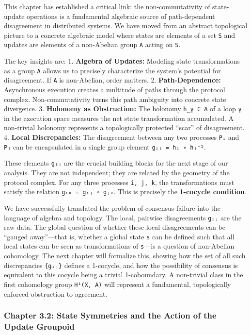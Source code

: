 \documentclass[
]{article}
\begin{document}
This chapter has established a critical link: the non-commutativity of
state-update operations is a fundamental algebraic source of
path-dependent disagreement in distributed systems. We have moved from
an abstract topological picture to a concrete algebraic model where
states are elements of a set \texttt{S} and updates are elements of a
non-Abelian group \texttt{A} acting on \texttt{S}.

The key insights are: 1. \textbf{Algebra of Updates:} Modeling state
transformations as a group \texttt{A} allows us to precisely
characterize the system's potential for disagreement. If \texttt{A} is
non-Abelian, order matters. 2. \textbf{Path-Dependence:} Asynchronous
execution creates a multitude of paths through the protocol complex.
Non-commutativity turns this path ambiguity into concrete state
divergence. 3. \textbf{Holonomy as Obstruction:} The holonomy
\texttt{h\_γ\ ∈\ A} of a loop \texttt{γ} in the execution space measures
the net state transformation accumulated. A non-trivial holonomy
represents a topologically protected ``scar'' of disagreement. 4.
\textbf{Local Discrepancies:} The disagreement between any two processes
\texttt{Pᵢ} and \texttt{Pⱼ} can be encapsulated in a single group
element \texttt{gᵢⱼ\ =\ hᵢ\ ∘\ hⱼ⁻¹}.

These elements \texttt{gᵢⱼ} are the crucial building blocks for the next
stage of our analysis. They are not independent; they are related by the
geometry of the protocol complex. For any three processes
\texttt{i,\ j,\ k}, the transformations must satisfy the relation
\texttt{gᵢₖ\ =\ gᵢⱼ\ ∘\ gⱼₖ}. This is precisely the \textbf{1-cocycle
condition}.

We have successfully translated the problem of consensus failure into
the language of algebra and topology. The local, pairwise disagreements
\texttt{gᵢⱼ} are the raw data. The global question of whether these
local disagreements can be ``gauged away''---that is, whether a global
state \texttt{s} can be defined such that all local states can be seen
as transformations of \texttt{s}---is a question of non-Abelian
cohomology. The next chapter will formalize this, showing how the set of
all such discrepancies \texttt{\{gᵢⱼ\}} defines a 1-cocycle, and how the
possibility of consensus is equivalent to this cocycle being a trivial
1-coboundary. A non-trivial class in the first cohomology group
\texttt{H¹(X,\ A)} will represent a fundamental, topologically enforced
obstruction to agreement.

\subsubsection{Chapter 3.2: State Symmetries and the Action of the
Update
Groupoid}\label{chapter-3.2-state-symmetries-and-the-action-of-the-update-groupoid}
\end{document}
